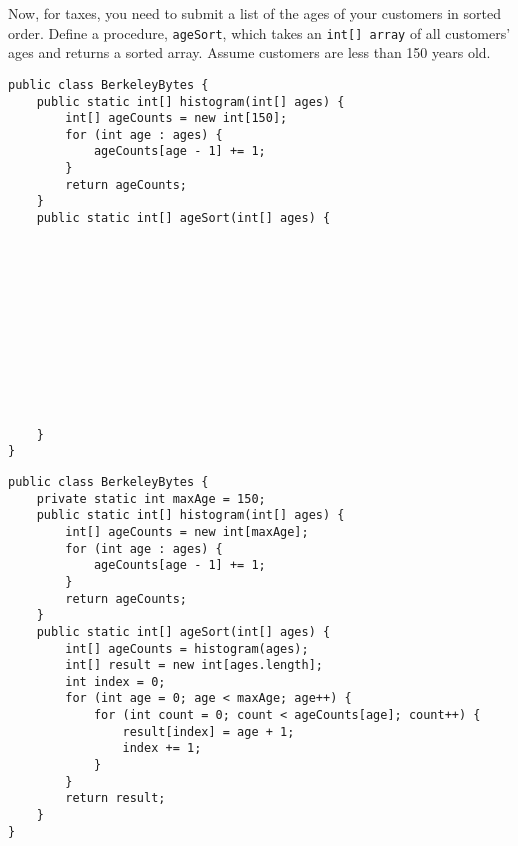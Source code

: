 \question Now, for taxes, you need to submit a list of the ages of your customers in sorted order. Define a procedure, \texttt{ageSort}, which takes an \texttt{int[] array} of all customers' ages and returns a sorted array. Assume customers are less than 150 years old.

\ifprintanswers
\else
\begin{lstlisting}
public class BerkeleyBytes {
    public static int[] histogram(int[] ages) {
        int[] ageCounts = new int[150];
        for (int age : ages) {
            ageCounts[age - 1] += 1;
        }
        return ageCounts;
    }
    public static int[] ageSort(int[] ages) {












    }
}
\end{lstlisting}
\fi

\begin{solution}
\begin{lstlisting}
public class BerkeleyBytes {
    private static int maxAge = 150;
    public static int[] histogram(int[] ages) {
        int[] ageCounts = new int[maxAge];
        for (int age : ages) {
            ageCounts[age - 1] += 1;
        }
        return ageCounts;
    }
    public static int[] ageSort(int[] ages) {
        int[] ageCounts = histogram(ages);
        int[] result = new int[ages.length];
        int index = 0;
        for (int age = 0; age < maxAge; age++) {
            for (int count = 0; count < ageCounts[age]; count++) {
                result[index] = age + 1;
                index += 1;
            }
        }
        return result;
    }
}
\end{lstlisting}
\end{solution}